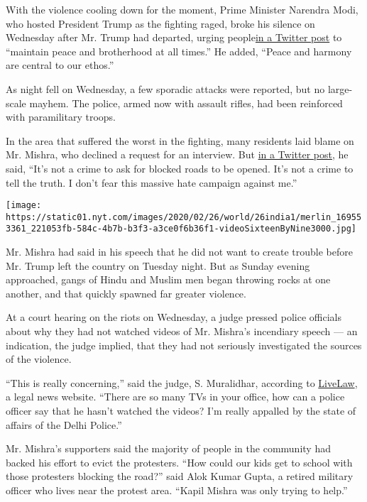 With the violence cooling down for the moment, Prime Minister Narendra
Modi, who hosted President Trump as the fighting raged, broke his
silence on Wednesday after Mr. Trump had departed, urging
people\href{https://twitter.com/narendramodi/status/1232581653916155912}{in
a Twitter post} to ``maintain peace and brotherhood at all times.'' He
added, ``Peace and harmony are central to our ethos.''

As night fell on Wednesday, a few sporadic attacks were reported, but no
large-scale mayhem. The police, armed now with assault rifles, had been
reinforced with paramilitary troops.

In the area that suffered the worst in the fighting, many residents laid
blame on Mr. Mishra, who declined a request for an interview. But
\href{https://twitter.com/KapilMishra_IND/status/1232292773581217794?s=20}{in
a Twitter post}, he said, ``It's not a crime to ask for blocked roads to
be opened. It's not a crime to tell the truth. I don't fear this massive
hate campaign against me.''

\texttt{[image: https://static01.nyt.com/images/2020/02/26/world/26india1/merlin\_169553361\_221053fb-584c-4b7b-b3f3-a3ce0f6b36f1-videoSixteenByNine3000.jpg]}

Mr. Mishra had said in his speech that he did not want to create trouble
before Mr. Trump left the country on Tuesday night. But as Sunday
evening approached, gangs of Hindu and Muslim men began throwing rocks
at one another, and that quickly spawned far greater violence.

At a court hearing on the riots on Wednesday, a judge pressed police
officials about why they had not watched videos of Mr. Mishra's
incendiary speech --- an indication, the judge implied, that they had
not seriously investigated the sources of the violence.

``This is really concerning,'' said the judge, S. Muralidhar, according
to
\href{https://twitter.com/LiveLawIndia/status/1232617825820381184}{LiveLaw},
a legal news website. ``There are so many TVs in your office, how can a
police officer say that he hasn't watched the videos? I'm really
appalled by the state of affairs of the Delhi Police.''

Mr. Mishra's supporters said the majority of people in the community had
backed his effort to evict the protesters. ``How could our kids get to
school with those protesters blocking the road?'' said Alok Kumar Gupta,
a retired military officer who lives near the protest area. ``Kapil
Mishra was only trying to help.''

